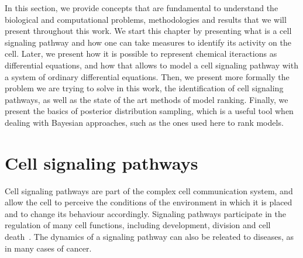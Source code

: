
In this section, we provide concepts that are fundamental to 
understand the biological and computational problems, methodologies and
results that we will present throughout this work. We start this chapter 
by presenting what is a cell signaling pathway and how one can take 
measures to identify its activity on the cell. Later, we present how 
it is possible to represent chemical iteractions as differential 
equations, and how that allows to model a cell signaling pathway
with a system of ordinary differential equations. Then, we present 
more formally the problem we are trying to solve in this work, the
identification of cell signaling pathways, as well as the state of the
art methods of model ranking. Finally, we present the basics of 
posterior distribution sampling, which is a useful tool when dealing 
with Bayesian approaches, such as the ones used here to rank models.

\section{Cell signaling pathways}
Cell signaling pathways are part of the complex cell communication 
system, and allow the cell to perceive the conditions of the 
environment in which it is placed and to change its behaviour
accordingly. Signaling pathways participate in the regulation of many
cell functions, including development, division and cell
death~\cite{Hancock2017}. The dynamics of a signaling pathway can also
be releated to diseases, as in many cases of cancer.

